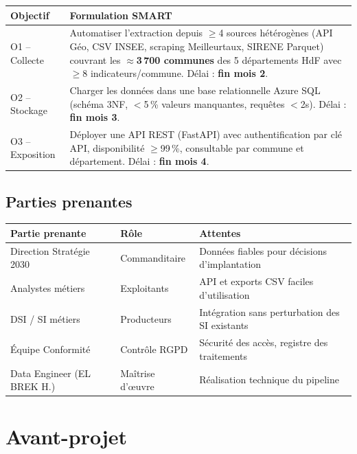 \documentclass[11pt,a4paper]{article}
\begin{document}
\vspace{0.3em}

\begin{tabular}{L{3.2cm} L{10.5cm}}
  \toprule
  \textbf{Objectif} & \textbf{Formulation SMART} \\
  \midrule
  O1 -- Collecte & Automatiser l'extraction depuis $\geq$4 sources hétérogènes (API Géo, CSV INSEE, scraping Meilleurtaux, SIRENE Parquet) couvrant les \textbf{$\approx$3\,700 communes} des 5 départements HdF avec $\geq$8 indicateurs/commune. Délai : \textbf{fin mois 2}. \\[0.5em]
  O2 -- Stockage & Charger les données dans une base relationnelle Azure SQL (schéma 3NF, $<$5\,\% valeurs manquantes, requêtes $<$2s). Délai : \textbf{fin mois 3}. \\[0.5em]
  O3 -- Exposition & Déployer une API REST (FastAPI) avec authentification par clé API, disponibilité $\geq$99\,\%, consultable par commune et département. Délai : \textbf{fin mois 4}. \\
  \bottomrule
\end{tabular}

\subsection{Parties prenantes}

\begin{tabular}{L{4cm} L{3.5cm} L{6cm}}
  \toprule
  \textbf{Partie prenante} & \textbf{Rôle} & \textbf{Attentes} \\
  \midrule
  Direction Stratégie 2030 & Commanditaire & Données fiables pour décisions d'implantation \\
  Analystes métiers & Exploitants & API et exports CSV faciles d'utilisation \\
  DSI / SI métiers & Producteurs & Intégration sans perturbation des SI existants \\
  Équipe Conformité & Contrôle RGPD & Sécurité des accès, registre des traitements \\
  Data Engineer (EL BREK H.) & Maîtrise d'œuvre & Réalisation technique du pipeline \\
  \bottomrule
\end{tabular}

\section{Avant-projet}
\end{document}

